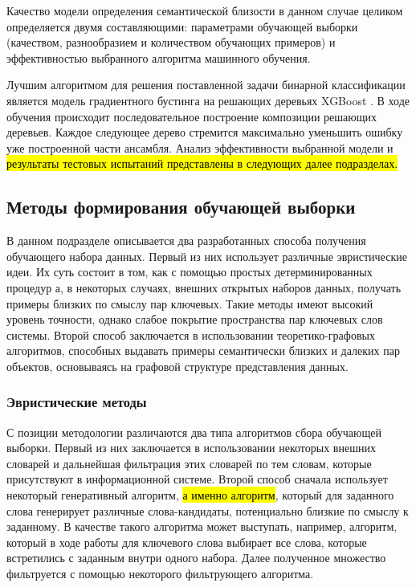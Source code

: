 Качество модели определения семантической близости в данном случае целиком определяется двумя составляющими: параметрами обучающей выборки (качеством, разнообразием и количеством обучающих примеров) и эффективностью выбранного алгоритма машинного обучения. 

Лучшим алгоритмом для решения поставленной задачи бинарной классификации является модель градиентного бустинга на решающих деревьях XGBoost \cite{xgboost}. В ходе обучения происходит последовательное построение композиции решающих деревьев. Каждое следующее дерево стремится максимально уменьшить ошибку уже построенной части ансамбля. Анализ эффективности выбранной модели и \hl{результаты тестовых испытаний представлены в следующих далее подразделах.} 

\subsection{Методы формирования обучающей выборки} \label{art_train}
В данном подразделе описывается два разработанных способа получения обучающего набора данных. Первый из них использует различные эвристические идеи. Их суть состоит в том, как с помощью простых детерминированных процедур а, в некоторых случаях, внешних открытых наборов данных, получать примеры близких по смыслу пар ключевых. Такие методы имеют высокий уровень точности, однако слабое покрытие пространства пар ключевых слов системы. Второй способ заключается в использовании теоретико-графовых алгоритмов, способных выдавать примеры семантически близких и далеких пар объектов, основываясь на графовой структуре представления данных.

\subsubsection{Эвристические методы}
С позиции методологии различаются два типа алгоритмов сбора обучающей выборки. Первый из них заключается в использовании некоторых внешних словарей и дальнейшая фильтрация этих словарей по тем словам, которые присутствуют в информационной системе. Второй способ сначала использует некоторый генеративный алгоритм, \hl{а именно алгоритм}, который для заданного слова генерирует различные слова-кандидаты, потенциально близкие по смыслу к заданному. В качестве такого алгоритма может выступать, например, алгоритм, который в ходе работы для ключевого слова выбирает все слова, которые встретились с заданным внутри одного набора. Далее полученное множество фильтруется с помощью некоторого фильтрующего алгоритма. 

